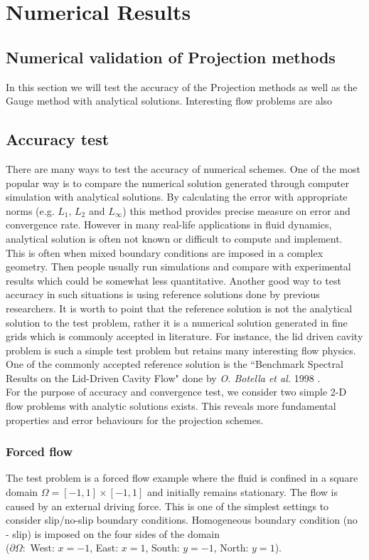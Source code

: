 \chapter{Numerical Results}
\label{chapter 7}

\section*{Numerical validation of Projection methods}
In this section we will test the accuracy of the Projection methods as well as the Gauge method with analytical solutions. Interesting flow problems are also 
\section{Accuracy test}
There are many ways to test the accuracy of numerical schemes. One of the most popular way is to compare the numerical solution generated through computer simulation with analytical solutions. By calculating the error with appropriate norms (e.g. $L_1,\,L_2$ and $L_\infty$) this method provides precise measure on error and convergence rate. However in many real-life applications in fluid dynamics, analytical solution is often not known or difficult to compute and implement. This is often when mixed boundary conditions are imposed in a complex geometry. Then people usually run simulations and compare with experimental results which could be somewhat less quantitative. Another good way to test accuracy in such situations is using reference solutions done by previous researchers. It is worth to point that the reference solution is not the analytical solution to the test problem, rather it is a numerical solution generated in fine grids which is commonly accepted in literature. For instance, the lid driven cavity problem is such a simple test problem but retains many interesting flow physics. One of the commonly accepted reference solution is the ``Benchmark Spectral Results on the Lid-Driven Cavity Flow" done by \emph{O. Botella et al.} 1998 \cite{botella1998benchmark}.\\

For the purpose of accuracy and convergence test, we consider two simple 2-D flow problems with analytic solutions exists. This reveals more fundamental properties and error behaviours for the projection schemes.\\

\subsection{Forced flow}
The test problem is a forced flow example where the fluid is confined in a square domain $\Omega = [-1,1] \times [-1,1]$ and initially remains stationary. The flow is caused by an external driving force. This is one of the simplest settings to consider slip/no-slip boundary conditions. Homogeneous boundary condition (no - slip) is imposed on the four sides of the domain \\
($\partial \Omega:$ West: $x = -1$, East: $x=1$, South: $y = -1$, North: $y=1$).\\

